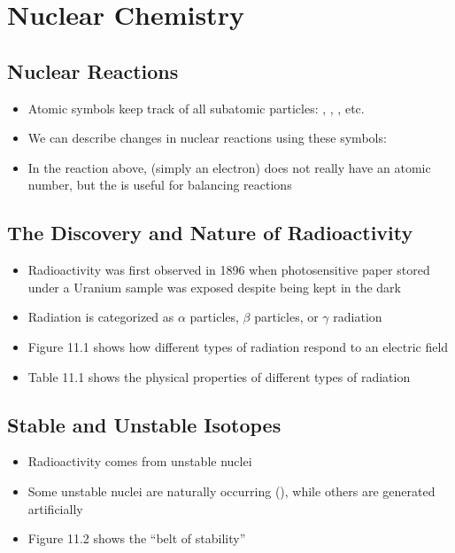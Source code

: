\documentclass[12pt, openany, letterpaper]{memoir}
\begin{document}
\chapter{Nuclear Chemistry}
\section{Nuclear Reactions}
\begin{itemize}
	\item Atomic symbols keep track of all subatomic particles: , , , etc.
	\item We can describe changes in nuclear reactions using these symbols:
	
	\item In the reaction above,  (simply an electron) does not really have an atomic number, but the  is useful for balancing reactions
\end{itemize}
\section{The Discovery and Nature of Radioactivity}
\begin{itemize}
	\item Radioactivity was first observed in 1896 when photosensitive paper stored under a Uranium sample was exposed despite being kept in the dark
	\item Radiation is categorized as $\alpha$ particles, $\beta$ particles, or $\gamma$ radiation
	\item Figure 11.1 shows how different types of radiation respond to an electric field
	\item Table 11.1 shows the physical properties of different types of radiation
\end{itemize}
\section{Stable and Unstable Isotopes}
\begin{itemize}
	\item Radioactivity comes from unstable nuclei
	\item Some unstable nuclei are naturally occurring (), while others  are generated artificially
	\item Figure 11.2 shows the ``belt of stability'' 
\end{itemize}
\end{document}
